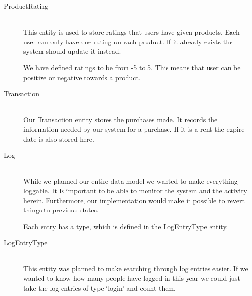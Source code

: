 \begin{description}
\item[ProductRating] \hfill \\
This entity is used to store ratings that users have given products. Each user can only have one rating on each product. If it already exists the system should update it instead.

We have defined ratings to be from -5 to 5. This means that user can be positive or negative towards a product.

\item[Transaction] \hfill \\
Our Transaction entity stores the purchases made. It records the information needed by our system for a purchase. If it is a rent the expire date is also stored here.

\item[Log] \hfill \\
While we planned our entire data model we wanted to make everything loggable. It is important to be able to monitor the system and the activity herein. Furthermore, our implementation would make it possible to revert things to previous states.

Each entry has a type, which is defined in the LogEntryType entity.

\item[LogEntryType] \hfill \\
This entity was planned to make searching through log entries easier. If we wanted to know how many people have logged in this year we could just take the log entries of type `login' and count them.
\end{description}